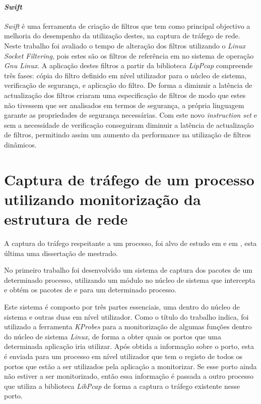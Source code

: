 \paragraph*{\textit{Swift}}
\textit{Swift} é uma ferramenta de criação de filtros que tem como principal objectivo a melhoria do desempenho da utilização destes, na captura de tráfego de rede.
Neste trabalho foi avaliado o tempo de alteração dos filtros utilizando o \textit{Linux Socket Filtering}, pois estes são os filtros de referência em no sistema de operação \textit{Gnu Linux}.
A aplicação destes filtros a partir da biblioteca \textit{LipPcap} compreende três fases: cópia do filtro definido em nível utilizador para o núcleo de sistema, verificação de segurança, e aplicação do filtro.
De forma a diminuir a latência de actualização dos filtros criaram uma especificação de filtros de modo que estes não tivessem que ser analisados em termos de segurança, a própria linguagem garante as propriedades de segurança necessárias.
Com este novo \textit{instruction set} e sem a necessidade de verificação conseguiram diminuir a latência de actualização de filtros, permitindo assim um aumento da performance na utilização de filtros dinâmicos.

\section{Captura de tráfego de um processo utilizando monitorização da estrutura de rede}\label{sect:outras_abordagens}

A captura do tráfego respeitante a um processo, foi alvo de estudo em \cite{1688981} e em \cite{Farruca:2009}, esta última uma dissertação de mestrado. 

No primeiro trabalho foi desenvolvido um sistema de captura dos pacotes de um determinado processo, utilizando um módulo no núcleo de sistema que intercepta e obtém os pacotes de e para um determinado processo.

Este sistema é composto por três partes essenciais, uma dentro do núcleo de sistema e outras duas em nível utilizador.
Como o título do trabalho indica, foi utilizado a ferramenta \textit{KProbes} para a monitorização de algumas funções dentro do núcleo de sistema \textit{Linux}, de forma a obter quais os portos que uma determinada aplicação iria utilizar.
Após obtida a informação sobre o porto, esta é enviada para um processo em nível utilizador que tem o registo de todos os portos que estão a ser utilizados pela aplicação a monitorizar.
Se esse porto ainda não estiver a ser monitorizado, então essa informação é passada a outro processo que utiliza a biblioteca \textit{LibPcap} de forma a captura o tráfego existente nesse porto.


